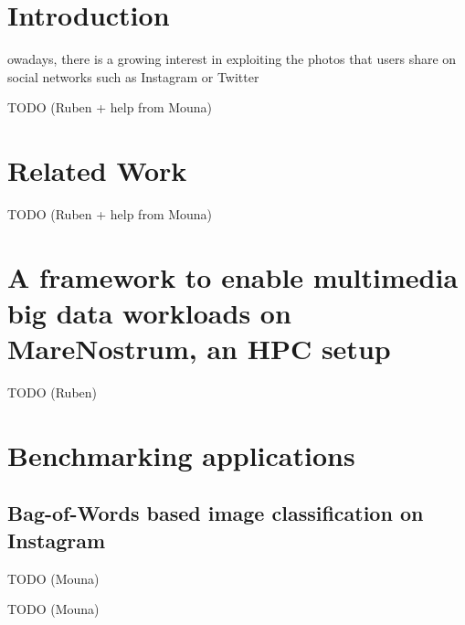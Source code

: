 \documentclass[journal]{IEEEtran}
\begin{document}





\section{Introduction}

owadays, there is a growing interest in exploiting the photos that users share on social networks such as Instagram or Twitter \cite{doi:10.1108/JRIM-07-2015-0047}\cite{conf/bigdataconf/Tous16}

TODO (Ruben + help from Mouna)

\section{Related Work}
\label{sec:rw}

TODO (Ruben + help from Mouna)

\section{A framework to enable multimedia big data workloads on MareNostrum, an HPC setup}
\label{sec:spark4mn}

TODO (Ruben)

\section{Benchmarking applications}
\label{sec:exps1}

\subsection{Bag-of-Words based image classification on Instagram}

TODO (Mouna)

TODO (Mouna)
\end{document}
